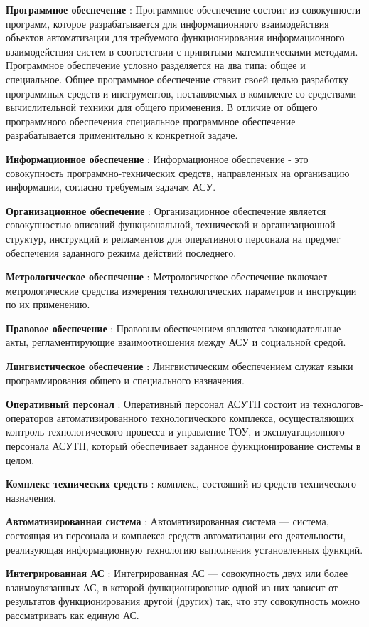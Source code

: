 \textbf{Программное обеспечение} : Программное обеспечение состоит из совокупности программ, которое разрабатывается для информационного взаимодействия объектов автоматизации для требуемого функционирования информационного взаимодействия систем в соответствии с принятыми математическими методами. Программное обеспечение условно разделяется на два типа: общее и специальное. Общее программное обеспечение ставит своей целью разработку программных средств и инструментов, поставляемых в комплекте со средствами вычислительной техники для общего применения. В отличие от общего программного обеспечения специальное программное обеспечение разрабатывается применительно к конкретной задаче.

\textbf{Информационное обеспечение} : Информационное обеспечение - это совокупность программно-технических средств, направленных на организацию информации, согласно требуемым задачам  АСУ.

\textbf{ Организационное обеспечение} : Организационное обеспечение является совокупностью описаний функциональной, технической и организационной структур, инструкций и регламентов для оперативного персонала на предмет обеспечения заданного режима действий последнего.

\textbf{ Метрологическое обеспечение} : Метрологическое обеспечение включает метрологические средства измерения технологических параметров и инструкции по их применению.

\textbf{ Правовое обеспечение} : Правовым обеспечением являются законодательные акты, регламентирующие взаимоотношения между АСУ и социальной средой.

\textbf{ Лингвистическое обеспечение} : Лингвистическим обеспечением служат языки программирования общего и специального назначения.

\textbf{ Оперативный персонал} : Оперативный персонал АСУТП состоит из технологов-операторов автоматизированного технологического комплекса, осуществляющих контроль технологического процесса и управление ТОУ, и эксплуатационного персонала АСУТП, который обеспечивает заданное функционирование системы в целом.

\textbf{Комплекс технических средств} : комплекс, состоящий из средств технического назначения.

\textbf{Автоматизированная система} : Автоматизированная система — система, состоящая из персонала и комплекса средств автоматизации его деятельности, реализующая информационную технологию выполнения установленных функций.

\textbf{Интегрированная АС} : Интегрированная АС — совокупность двух или более взаимоувязанных АС, в которой функционирование одной из них зависит от результатов функционирования другой (других) так, что эту совокупность можно рассматривать как единую АС.

